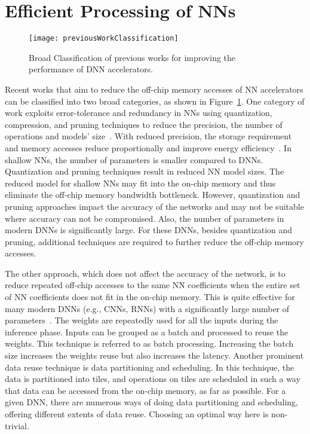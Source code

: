 \section{Efficient Processing of NNs}
\begin{figure}[!htb]
	\centering
	\captionsetup{font=sf}
	\texttt{[image: previousWorkClassification]}
	\caption{Broad Classification of previous works for improving the performance of DNN accelerators.}
	\label{fig:previousWorkClassification}
\end{figure}
Recent works that aim to reduce the off-chip memory accesses of NN accelerators can be classified into two broad categories, as shown in Figure~\ref{fig:previousWorkClassification}. One category of work exploits error-tolerance and redundancy in NNs using quantization, compression, and pruning techniques to reduce the precision, the number of operations and models' size~\cite{ferreira2016fpga,wang2018c,chang2015recurrent,han2017ese,lee2016fpga}. With reduced precision, the storage requirement and memory accesses reduce proportionally and improve energy efficiency~\cite{sze2017efficient}. In shallow NNs, the number of parameters is smaller compared to DNNs. Quantization and pruning techniques result in reduced NN model sizes. The reduced model for shallow NNs may fit into the on-chip memory and thus eliminate the off-chip memory bandwidth bottleneck. However, quantization and pruning approaches impact the accuracy of the networks and may not be suitable where accuracy can not be compromised. Also, the number of parameters in modern DNNs is significantly large. For these DNNs, besides quantization and pruning, additional techniques are required to further reduce the off-chip memory accesses.

The other approach, which does not affect the accuracy of the network, is to reduce repeated off-chip accesses to the same NN coefficients when the entire set of NN coefficients does not fit in the on-chip memory. This is quite effective for many modern DNNs (e.g., CNNs, RNNs) with a significantly large number of parameters~\cite{zhang2015optimizing,Li2018SmartShuttleOO,que2019efficient,park2020time}. The weights are repeatedly used for all the inputs during the inference phase. Inputs can be grouped as a batch and processed to reuse the weights. This technique is referred to as batch processing. Increasing the batch size increases the weights reuse but also increases the latency. Another prominent data reuse technique is data partitioning and scheduling. In this technique, the data is partitioned into tiles, and operations on tiles are scheduled in such a way that data can be accessed from the on-chip memory, as far as possible. For a given DNN, there are numerous ways of doing data partitioning and scheduling, offering different extents of data reuse. Choosing an optimal way here is non-trivial.


